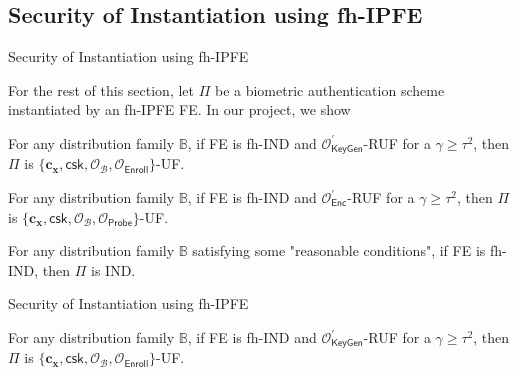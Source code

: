 \subsection{Security of Instantiation using fh-IPFE}


\begin{frame}{Security of Instantiation using fh-IPFE}

For the rest of this section, let $\Pi$ be a biometric authentication scheme instantiated by an fh-IPFE \textsf{FE}.
\pause
In our project, we show
\pause

\begin{theorem}
	For any distribution family $\mathbb{B}$, if \textsf{FE} is fh-IND and $\mathcal{O}^\prime_{\textsf{KeyGen}}$-RUF for a $\gamma \geq \tau^2$, then $\Pi$ is $\{ \mathbf{c_x}, \textsf{csk}, \mathcal{O}_\mathcal{B}, \mathcal{O}_{\textsf{Enroll}} \}$-UF. 
\end{theorem}
\pause

\begin{theorem}
	For any distribution family $\mathbb{B}$, if \textsf{FE} is fh-IND and $\mathcal{O}^\prime_{\textsf{Enc}}$-RUF for a $\gamma \geq \tau^2$, then $\Pi$ is $\{\mathbf{c_x}, \textsf{csk}, \mathcal{O}_\mathcal{B}, \mathcal{O}_{\textsf{Probe}} \}$-UF. 
\end{theorem}
\pause

\begin{theorem}
	For any distribution family $\mathbb{B}$ satisfying some "reasonable conditions", if \textsf{FE} is fh-IND, then $\Pi$ is IND.

\end{theorem}

\end{frame}


\begin{frame}{Security of Instantiation using fh-IPFE}

{}

\begin{theorem}
	For any distribution family $\mathbb{B}$, if \textsf{FE} is fh-IND and $\mathcal{O}^\prime_{\textsf{KeyGen}}$-RUF for a $\gamma \geq \tau^2$, then $\Pi$ is $\{ \mathbf{c_x}, \textsf{csk}, \mathcal{O}_\mathcal{B}, \mathcal{O}_{\textsf{Enroll}} \}$-UF. 
\end{theorem}


\begin{theorem}
{}
\end{theorem}


\begin{theorem}
{}
\end{theorem}

\end{frame}


